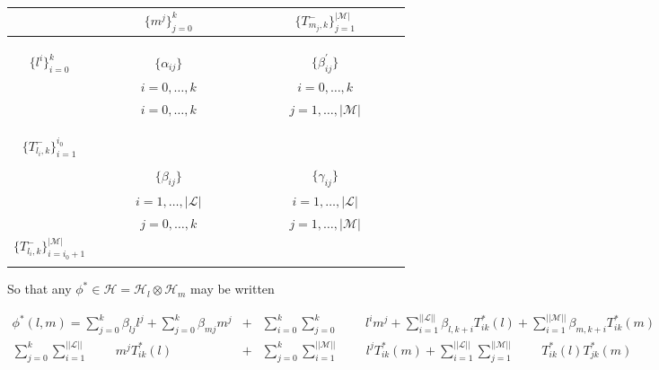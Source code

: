 \documentclass[12pt]{article}
\theoremstyle{definition}
\begin{document}
\begin{center}
\begin{tabular}{c|ccccccc:ccccccc} 
			                   &   & &  &$\big \lbrace  m^j  \big \rbrace_{j=0}^k$ & & & & & & &$\big \lbrace T_{m_j,k}^- \big \rbrace_{j=1}^{\vert \mathcal{M}\vert}$ & &  & \\ \hline
&&&&&&&&&&&&&& \\
&&&&&&&&&&&&&& \\
&&&&&&&&&&&&&& \\
$\big \lbrace  l^i  \big \rbrace_{i=0}^k$ &&&&$\big \lbrace \alpha_{ij} \big \rbrace$&&&&&&&$\big \lbrace \beta^\prime_{ij} \big \rbrace$&&&\\
&&&&$i=0,\dots,k$&&&&&&& $i=0,\dots,k$&&& \\
&&&&$i=0,\dots,k$&&&&&&&$j=1,\dots,\vert \mathcal{M}\vert$&&& \\
&&&&&&&&&&&&&&\\
&&&&&&&&&&&&&&\\ 
&&&&&&&&&&&&&& \\
$\big \lbrace T_{l_i,k}^- \big \rbrace_{i=1}^{i_0}$ &&&&&&&&&&&&&&\\
&&&&&&&&&&&&&& \\ 
&&&& $\big \lbrace \beta_{ij} \big \rbrace$ &&&&&&&$\big \lbrace \gamma_{ij} \big \rbrace$&&& \\
\hdashline
&&&&$i=1,\dots,\vert \mathcal{L} \vert$&&&&&&&$i=1,\dots,\vert \mathcal{L} \vert$&&& \\ 
&&&&$j=0,\dots,k$&&&&&&&$j=1,\dots,\vert \mathcal{M} \vert$&&& \\ 
$\big \lbrace T_{l_i,k}^- \big \rbrace_{i=i_0+1}^{\vert \mathcal{M}\vert}$ &&&&&&&&&&&&&&\\
&&&&&&&&&&&&&& \\ 
\end{tabular}
\end{center}

So that any $\phi^* \in \mathcal{H} = \mathcal{H}_l \otimes \mathcal{H}_m$ may be written

\begin{eqnarray*}
\phi^*\left( l,m \right) = \sum_{j=0}^k \beta_{lj}l^j + \sum_{j=0}^k \beta_{mj} m^{j} &+& \sum_{i=0}^k\sum_{j=0}^k\;\;\;\;\;\;\;\; l^i m^j  + \sum_{i=1}^{\vert \vert \mathcal{L}\vert \vert}\beta_{l,k+i} T_{ik}^*\left(l\right) + \sum_{i=1}^{\vert \vert \mathcal{M}\vert \vert}\beta_{m,k+i}T_{ik}^*\left(m\right) \\ 
 \sum_{j=0}^k\sum_{i=1}^{\vert \vert \mathcal{L}\vert \vert}\;\;\;\; \;\;\;\; m^j T_{ik}^*\left(l\right) &+& \sum_{j=0}^k\sum_{i=1}^{\vert \vert \mathcal{M}\vert \vert}\;\;\;\; \;\;\;\;   l^j T_{ik}^*\left(m\right) + \sum_{i=1}^{\vert \vert \mathcal{L}\vert \vert}\sum_{j=1}^{\vert \vert \mathcal{M}\vert \vert}\;\;\;\;\;\;\;\; T_{ik}^*\left(l\right)T_{jk}^*\left(m\right) \\
\end{eqnarray*}
\end{document}
